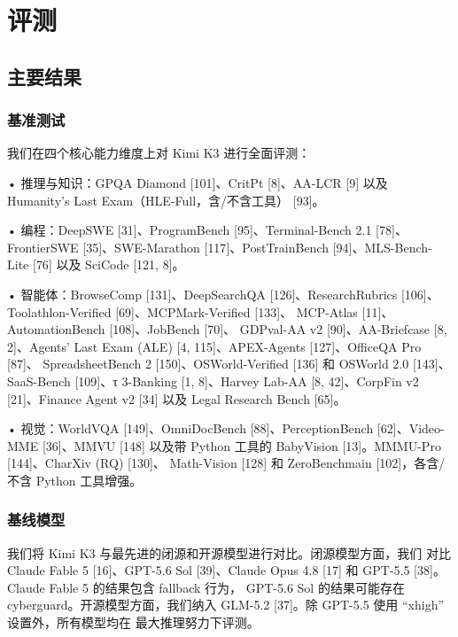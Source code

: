 \section{评测}\label{evaluations}

\subsection{主要结果}\label{main-results}

\subsubsection{基准测试}\label{benchmarks}

我们在四个核心能力维度上对 Kimi K3 进行全面评测：

• 推理与知识：GPQA Diamond {[}101{]}、CritPt {[}8{]}、AA-LCR
{[}9{]} 以及 Humanity's Last Exam（HLE-Full，含/不含工具）
{[}93{]}。

• 编程：DeepSWE {[}31{]}、ProgramBench {[}95{]}、Terminal-Bench 2.1
{[}78{]}、FrontierSWE {[}35{]}、SWE-Marathon {[}117{]}、PostTrainBench
{[}94{]}、MLS-Bench-Lite {[}76{]} 以及 SciCode {[}121, 8{]}。

• 智能体：BrowseComp {[}131{]}、DeepSearchQA {[}126{]}、ResearchRubrics
{[}106{]}、Toolathlon-Verified {[}69{]}、MCPMark-Verified {[}133{]}、
MCP-Atlas {[}11{]}、AutomationBench {[}108{]}、JobBench {[}70{]}、
GDPval-AA v2 {[}90{]}、AA-Briefcase {[}8, 2{]}、Agents' Last Exam (ALE)
{[}4, 115{]}、APEX-Agents {[}127{]}、OfficeQA Pro {[}87{]}、
SpreadsheetBench 2 {[}150{]}、OSWorld-Verified {[}136{]} 和 OSWorld 2.0
{[}143{]}、SaaS-Bench {[}109{]}、τ 3-Banking {[}1, 8{]}、Harvey Lab-AA
{[}8, 42{]}、CorpFin v2 {[}21{]}、Finance Agent v2 {[}34{]} 以及 Legal
Research Bench {[}65{]}。

• 视觉：WorldVQA {[}149{]}、OmniDocBench {[}88{]}、PerceptionBench
{[}62{]}、Video-MME {[}36{]}、MMVU {[}148{]} 以及带 Python 工具的 BabyVision
{[}13{]}。MMMU-Pro {[}144{]}、CharXiv (RQ) {[}130{]}、
Math-Vision {[}128{]} 和 ZeroBenchmain {[}102{]}，各含/不含
Python 工具增强。

\subsubsection{基线模型}\label{baselines}

我们将 Kimi K3 与最先进的闭源和开源模型进行对比。闭源模型方面，我们
对比 Claude Fable 5 {[}16{]}、GPT-5.6 Sol {[}39{]}、Claude Opus 4.8
{[}17{]} 和 GPT-5.5 {[}38{]}。Claude Fable 5 的结果包含 fallback 行为，
GPT-5.6 Sol 的结果可能存在 cyberguard。开源模型方面，我们纳入
GLM-5.2 {[}37{]}。除 GPT-5.5 使用 ``xhigh'' 设置外，所有模型均在
最大推理努力下评测。


